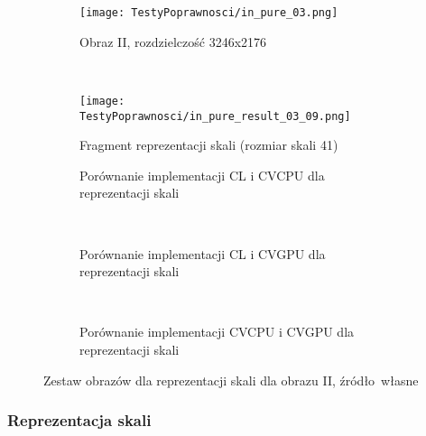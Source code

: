 \begin{figure}[h]
\begin{center}
\begin{subfigure}[t]{0.3\textwidth}
\texttt{[image: TestyPoprawnosci/in\_pure\_03.png]}
\caption{Obraz II, rozdzielczość 3246x2176}
\label{fig:valPure03}
\end{subfigure}
~
\begin{subfigure}[t]{0.3\textwidth}
\begin{center}
\texttt{[image: TestyPoprawnosci/in\_pure\_result\_03\_09.png]}
\end{center}
\caption{Fragment reprezentacji skali (rozmiar skali 41)}
\label{fig:valPure03}
\end{subfigure}
\end{center}

\begin{subfigure}[t]{0.3\textwidth}
	\centering
	\setlength\fboxsep{0pt}
	\setlength\fboxrule{0.5pt}
	\caption{Porównanie implementacji CL i CVCPU dla reprezentacji skali}
	\label{fig:valPure3CLCVCPU}
\end{subfigure}
~
\begin{subfigure}[t]{0.3\textwidth}
	\centering
	\setlength\fboxsep{0pt}
	\setlength\fboxrule{0.5pt}
	\caption{Porównanie implementacji CL i CVGPU dla reprezentacji skali}
	\label{fig:valPure3CLCVGPU}
\end{subfigure}
~
\begin{subfigure}[t]{0.3\textwidth}
	\centering
	\setlength\fboxsep{0pt}
	\setlength\fboxrule{0.5pt}
	\caption{Porównanie implementacji CVCPU i CVGPU dla reprezentacji skali}
	\label{fig:valPure3CVCPUCVGPU}                 
\end{subfigure}
\caption{Zestaw obrazów dla reprezentacji skali dla obrazu II, \tiny{źródło~własne}}

\label{fig:valPure3}
\end{figure}

\subsubsection{Reprezentacja skali}
\label{subsubsec:reprezentacjaSkaliRysunki}


